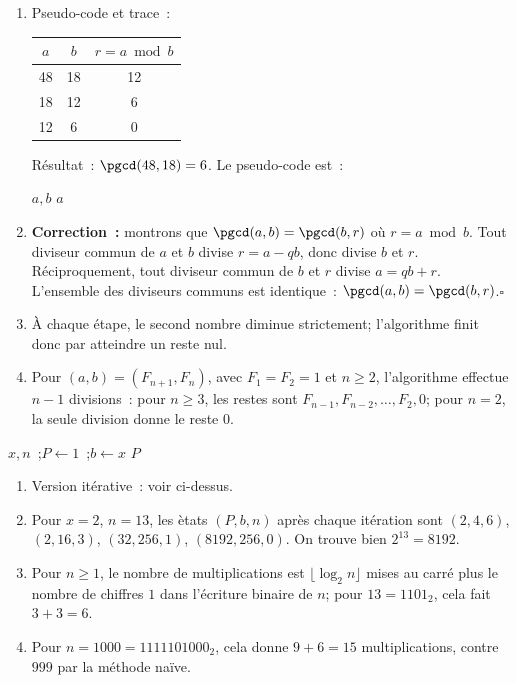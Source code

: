 \begin{enumerate}
  \item Pseudo-code et trace~:
\begin{center}
\renewcommand{\arraystretch}{1.25}
\begin{tabular}{ccc}
\toprule
$a$ & $b$ & $r=a\bmod b$ \\ \midrule
48 & 18 & 12 \\
18 & 12 & 6 \\
12 & 6 & 0 \\
\bottomrule
\end{tabular}
\end{center}
R\'esultat~: $\pgcd(48,18)=6$.
Le pseudo-code est~:
\begin{algorithm}[H]
\caption{PGCD par l'algorithme d'Euclide}
\Lire $a,b$\;
\Afficher $a$\;
\end{algorithm}
  \item \textbf{Correction~:} montrons que $\pgcd(a,b)=\pgcd(b,r)$ o\`u $r=a\bmod b$.
        Tout diviseur commun de $a$ et $b$ divise $r=a-qb$,
        donc divise $b$ et $r$. R\'eciproquement, tout diviseur commun de $b$
        et $r$ divise $a=qb+r$. L'ensemble des diviseurs communs est identique~:
        $\pgcd(a,b)=\pgcd(b,r)$.\hfill$\square$
  \item À chaque étape, le second nombre diminue strictement; l'algorithme finit
        donc par atteindre un reste nul.
  \item Pour $(a,b)=(F_{n+1},F_n)$, avec $F_1=F_2=1$ et $n\geq2$,
        l'algorithme effectue $n-1$ divisions~: pour $n\geq3$,
        les restes sont $F_{n-1},F_{n-2},\ldots,F_2,0$;
        pour $n=2$, la seule division donne le reste $0$.
\end{enumerate}


\begin{algorithm}[H]
\caption{Exponentiation rapide (it\'erative)}
\Lire $x, n$~;\quad $P \leftarrow 1$~;\quad $b \leftarrow x$\;
\Afficher $P$\;
\end{algorithm}

\begin{enumerate}
  \item Version it\'erative~: voir ci-dessus.
  \item Pour $x=2$, $n=13$, les \`etats $(P,b,n)$ apr\`es chaque it\'eration sont
        $(2,4,6)$, $(2,16,3)$, $(32,256,1)$, $(8192,256,0)$.
        On trouve bien $2^{13}=8192$.
  \item Pour $n\geq1$, le nombre de multiplications est
        $\lfloor\log_2 n\rfloor$ mises au carr\'e plus le nombre de chiffres
        $1$ dans l'\'ecriture binaire de $n$; pour $13=1101_2$, cela fait $3+3=6$.
  \item Pour $n=1000=1111101000_2$, cela donne $9+6=15$
        multiplications, contre $999$ par la m\'ethode na\"ive.
\end{enumerate}

